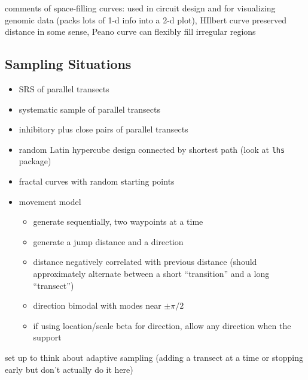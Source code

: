 \documentclass[review]{elsarticle}
\begin{document}
comments of space-filling curves: used in circuit design and for visualizing
genomic data (packs lots of 1-d info into a 2-d plot), HIlbert curve preserved
distance in some sense, Peano curve can flexibly fill irregular regions


\subsection{Sampling Situations}

\begin{itemize}

\item SRS of parallel transects

\item systematic sample of parallel transects

\item inhibitory plus close pairs of parallel transects

\item random Latin hypercube design connected by shortest path (look at
\texttt{lhs} package)

\item fractal curves with random starting points

\item movement model
\begin{itemize}
\item generate sequentially, two waypoints at a time
\item generate a jump distance and a direction
\item distance negatively correlated with previous distance (should
approximately alternate between a short ``transition'' and a long ``transect'')
\item direction bimodal with modes near \(\pm \pi / 2\)
\item if using location/scale beta for direction, allow any direction when the
support 
\end{itemize}

\end{itemize}

set up to think about adaptive sampling (adding a transect at a time or
stopping early but don't actually do it here)

\end{document}
